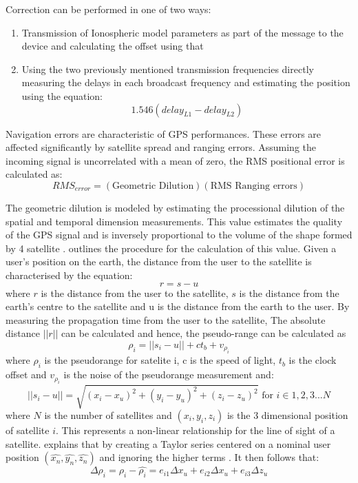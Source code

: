  Correction can be performed in one of two ways:
\begin{enumerate}
	\item Transmission of Ionospheric model parameters as part of the message to the device and calculating the offset using that
	\item Using the two previously mentioned transmission frequencies directly measuring the delays in each broadcast frequency and estimating the position using the equation:\cite{spilker1996global}
	\begin{equation}
		1.546(delay_{L1} - delay_{L2})
	\end{equation}
\end{enumerate}

Navigation errors are characteristic of GPS performances. These errors are affected significantly by satellite spread and ranging errors. Assuming the incoming signal is uncorrelated with a mean of zero, the RMS positional error is calculated as:
\begin{equation}
	RMS_{error} = (\text{Geometric Dilution})(\text{RMS Ranging errors})
\end{equation}

The geometric dilution is modeled by estimating the processional dilution of the spatial and temporal dimension measurements. This value estimates the quality of the GPS signal and is inversely proportional to the volume of the shape formed by 4 satellite \cite{jwo2001efficient}. \textcite{jwo2001efficient} outlines the procedure for the calculation of this value. Given a user's position on the earth, the distance from the user to the satellite is characterised by the equation:
\begin{equation}
	r =  s - u
\end{equation}
where $r$ is the distance from the user to the satellite, $s$ is the distance from the earth's centre to the satellite and u is the distance from the earth to the user. By measuring the propagation time from the user to the satellite, The absolute distance $||r||$ can be calculated and hence, the pseudo-range can be calculated as
\begin{equation}
	\rho_i = ||s_i-u||+ct_b + v_{\rho_i}
\end{equation}
where $\rho_i$ is the pseudorange for satelite i, c is the speed of light, $t_b$ is  the clock offset and $v_{\rho_i}$ is the noise of the pseudorange measurement and:
\begin{equation}
	||s_i-u|| = \sqrt{(x_i - x_u)^2+(y_i-y_u)^2+(z_i-z_u)^2} \text{ for } i \in 1,2,3...N \label{los}
\end{equation}
where $N$ is the number of satellites and $(x_i,y_i,z_i)$ is the 3 dimensional position of satellite $i$. This represents a non-linear relationship for the line of sight of a satellite.  \textcite{jwo2001efficient} explains that by creating a Taylor series centered on a nominal user position $(\hat{x_n},\hat{y_n},\hat{z_n})$ and ignoring the higher terms \cite{jwo2001efficient}. It then follows that:
\begin{equation}
	\Delta\rho_i = \rho_i - \hat{\rho_i} = e_{i1}\Delta x_u + e_{i2}\Delta x_u +  e_{i3}\Delta z_u
\end{equation}

